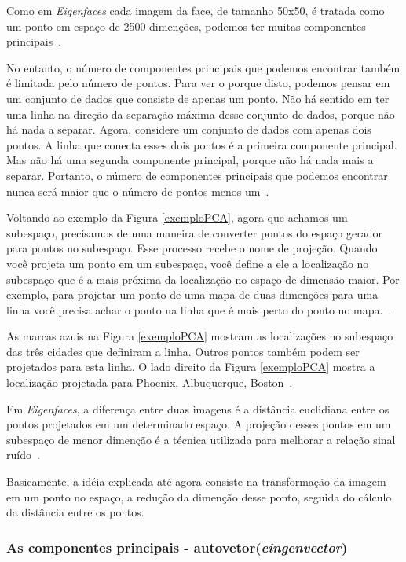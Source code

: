 Como em \textit{Eigenfaces} cada imagem da face, de tamanho 50x50, é tratada como um ponto em espaço de 2500 dimenções, podemos ter muitas componentes principais~\cite{hewitt}.

No entanto, o número de componentes principais que podemos encontrar também é limitada pelo número de pontos. Para ver o porque disto, podemos pensar em um conjunto de dados que consiste de apenas um ponto. Não há sentido em ter uma linha na direção da separação máxima desse conjunto de dados, porque não há nada a separar. Agora, considere um conjunto de dados com apenas dois pontos. A linha que conecta esses dois pontos é a primeira componente principal. Mas não há uma segunda componente principal, porque não há nada mais a separar. Portanto, o número de componentes principais que podemos encontrar nunca será maior que o número de pontos menos um~\cite{hewitt}.

Voltando ao exemplo da Figura \ref{exemploPCA}, agora que achamos um subespaço, precisamos de uma maneira de converter pontos do espaço gerador para pontos no subespaço. Esse processo recebe o nome de projeção. Quando você projeta um ponto em um subespaço, você define a ele a localização no subespaço que é a mais próxima da localização no espaço de dimensão maior. Por exemplo, para projetar um ponto de uma mapa de duas dimenções para uma linha você precisa achar o ponto na linha que é mais perto do ponto no mapa.~\cite{hewitt}.

As marcas azuis na Figura \ref{exemploPCA} mostram as localizações no subespaço das três cidades que definiram a linha. Outros pontos também podem ser projetados para esta linha. O lado direito da Figura \ref{exemploPCA} mostra a localização projetada para Phoenix, Albuquerque, Boston~\cite{hewitt}.

Em \textit{Eigenfaces}, a diferença entre duas imagens é a distância euclidiana entre os pontos projetados em um determinado espaço. A projeção desses pontos em um subespaço de menor dimenção é a técnica utilizada para melhorar a relação sinal ruído~\cite{hewitt}.

Basicamente, a idéia explicada até agora consiste na transformação da imagem em um ponto no espaço, a redução da dimenção desse ponto, seguida do cálculo da distância entre os pontos.

\subsubsection{As componentes principais - autovetor(\textit{eingenvector})}

